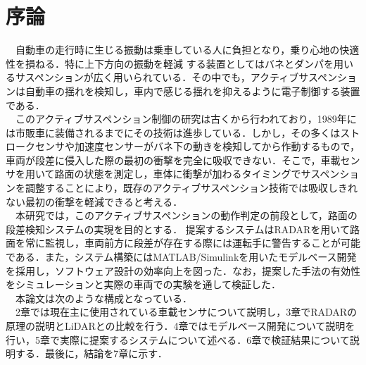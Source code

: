 \chapter{序論}
　自動車の走行時に生じる振動は乗車している人に負担となり，乗り心地の快適性を損ねる．特に上下方向の振動を軽減
する装置としてはバネとダンパを用いるサスペンションが広く用いられている．その中でも，アクティブサスペンションは自動車の揺れを検知し，車内で感じる揺れを抑えるように電子制御する装置である．\\
　このアクティブサスペンション制御の研究は古くから行われており，1989年には市販車に装備されるまでにその技術は進歩している\cite{active_suspension}．しかし，その多くはストロークセンサや加速度センサーがバネ下の動きを検知してから作動するもので，車両が段差に侵入した際の最初の衝撃を完全に吸収できない．そこで，車載センサを用いて路面の状態を測定し，車体に衝撃が加わるタイミングでサスペンションを調整することにより，既存のアクティブサスペンション技術では吸収しきれない最初の衝撃を軽減できると考える．\\
　本研究では，このアクティブサスペンションの動作判定の前段として，路面の段差検知システムの実現を目的とする．
提案するシステムはRADARを用いて路面を常に監視し，車両前方に段差が存在する際には運転手に警告することが可能である．また，システム構築にはMATLAB/Simulinkを用いたモデルベース開発を採用し，ソフトウェア設計の効率向上を図った．なお，提案した手法の有効性をシミュレーションと実際の車両での実験を通して検証した．\\
　本論文は次のような構成となっている．\\
　2章では現在主に使用されている車載センサについて説明し，3章でRADARの原理の説明とLiDARとの比較を行う．4章ではモデルベース開発について説明を行い，5章で実際に提案するシステムについて述べる．6章で検証結果について説明する．最後に，結論を7章に示す．\\
